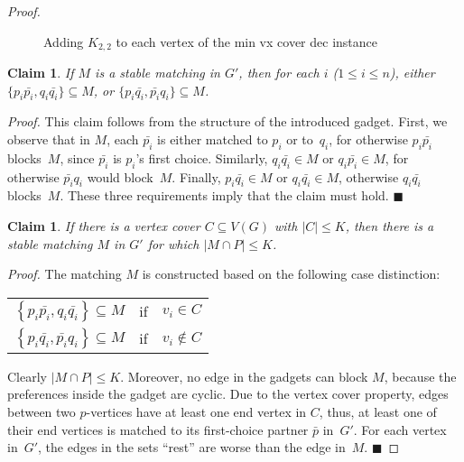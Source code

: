 \documentclass[preprint,12pt]{elsarticle}
\newcommand{\myqed}{$\blacksquare$}
\newcommand{\myproof}{\noindent\textit{Proof. }}
\newcommand{\ktwotwo}[2]{
\coordinate (p) at #1;
\begin{scope}[rotate around={#2:(p)}]
	\node[vertex, ultra thick, gray] (p) at (p) {$$};
	\node[vertex] (p') at ($(1,0)+(p)$) {$$};
	\node[vertex] (q) at ($(0, -1)+(p)$) {$$};
	\node[vertex] (q') at ($(1, -1)+(p)$) {$$};
	
	\draw [ultra thick, gray, dotted] (p) -- (p');
	\draw [] (p) -- (q');
	\draw [] (q) -- (q');
	\draw [] (q) -- (p');
\end{scope}
}
\newtheorem{claim}[theorem]{Claim}
\begin{document}
\begin{proof}
\begin{center}
\begin{figure}[h]
\caption{Adding $K_{2,2}$ to each vertex of the {\sc min vx cover dec} instance}
\label{fi:srminforbidden}
\end{figure}
\end{center}

\begin{claim}
\label{cl:vxcover_stable}
	If $M$ is a stable matching in $G'$, then for each $i$ ($1\leq i\leq n$), either $\{p_i \bar{p_i},q_i \bar{q_i}\}\subseteq M$, or $\{p_i \bar{q_i},\bar{p_i} q_i\}\subseteq M$.
\end{claim}

	\myproof This claim follows from the structure of the introduced gadget. First, we observe that in $M$, each $\bar{p_i}$ is either matched to $p_i$ or to~$q_i$, for otherwise $p_i \bar{p_i}$ blocks~$M$, since $\bar{p_i}$ is $p_i$'s first choice. Similarly, $q_i \bar{q_i} \in M$ or $q_i\bar{p_i} \in M$, for otherwise $\bar{p_i}q_i$ would block~$M$. Finally, $p_i \bar{q_i} \in M$ or $q_i \bar{q_i} \in M$, otherwise $q_i \bar{q_i}$ blocks~$M$. These three requirements imply that the claim must hold.  \myqed

\begin{claim}
	If there is a vertex cover $C \subseteq V(G)$ with $|C| \leq K$, then there is a stable matching $M$ in $G'$ for which $|M \cap P| \leq K$.
    \label{cl:vc-stable}
\end{claim}

	\myproof The matching $M$ is constructed based on the following case distinction:	
	\begin{center}
	\begin{tabular}{ l c l }
	$\left\{p_i \bar{p_i}, q_i \bar{q_i}\right\} \subseteq M$ & if & $v_i \in C$\\
	$\left\{p_i \bar{q_i}, \bar{p_i} q_i \right\} \subseteq M$ & if & $v_i \notin C$
	\end{tabular}
\end{center}
Clearly $|M \cap P| \leq K$. Moreover, no edge in the gadgets can block $M$, because the preferences inside the gadget are cyclic. Due to the vertex cover property, edges between two $p$-vertices have at least one end vertex in $C$, thus, at least one of their end vertices is matched to its first-choice partner $\bar{p}$ in~$G'$. For each vertex in~$G'$, the edges in the sets ``rest'' are worse than the edge in~$M$.  \myqed


\end{proof}
\end{document}
